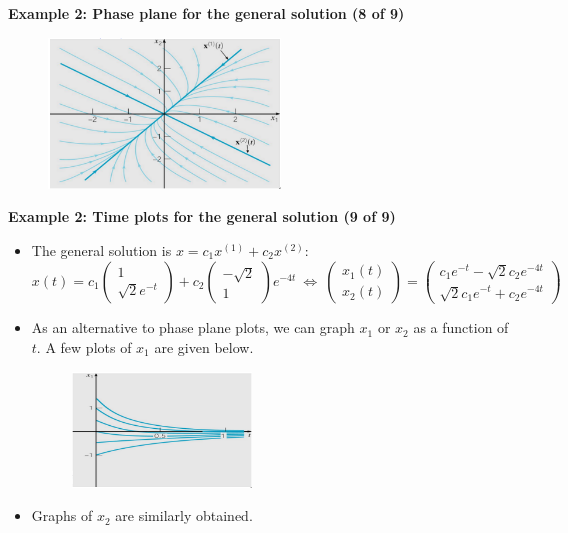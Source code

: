 \documentclass[11pt,a4paper]{article}
\begin{document}
	\textbf{Example 2: Phase plane for the general solution (8 of 9)}
	\begin{figure}[H]
		\centering
			\includegraphics[width=0.55\textwidth]{figure/Lec12f5.PNG}
	\end{figure}
	\textbf{Example 2: Time plots for the general solution (9 of 9)}
	\begin{itemize}
		\item The general solution is $x = c_1x^{(1)} + c_2x^{(2)}$:
		$$
		x(t)=c_1
		\begin{pmatrix}
			1\\
			\sqrt{2}e^{-t}
		\end{pmatrix}+c_2
		\begin{pmatrix}
			-\sqrt{2}\\
			1
		\end{pmatrix}e^{-4t}\ \Leftrightarrow\ 
		\begin{pmatrix}
			x_1(t)\\
			x_2(t)
		\end{pmatrix} =
		\begin{pmatrix}
			c_1e^{-t}-\sqrt{2}c_2e^{-4t}\\
			\sqrt{2}c_1e^{-t} + c_2e^{-4t}
		\end{pmatrix}
		$$
		\item As an alternative to phase plane plots, we can graph $x_1$ or $x_2$ as a function of $t$. A few plots of $x_1$ are given below.
		\begin{figure}[H]
			\centering
				\includegraphics[width=0.45\textwidth]{figure/Lec12f6.PNG}
		\end{figure}
		\item Graphs of $x_2$ are similarly obtained.
	\end{itemize}
\end{document}
